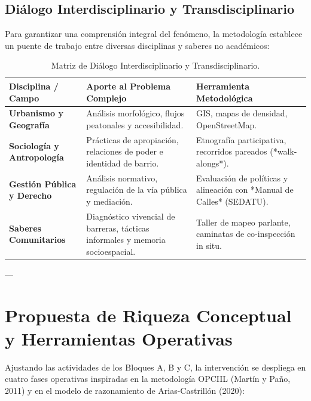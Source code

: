 \documentclass[12pt,a4paper]{article}
\begin{document}
\subsection{Diálogo Interdisciplinario y Transdisciplinario}
Para garantizar una comprensión integral del fenómeno, la metodología establece un puente de trabajo entre diversas disciplinas y saberes no académicos:

\begin{table}[htbp]
\centering
\small
\caption{Matriz de Diálogo Interdisciplinario y Transdisciplinario.}
\begin{tabular}{p{4.2cm} p{5.2cm} p{5.2cm}}
\toprule
\textbf{Disciplina / Campo} & \textbf{Aporte al Problema Complejo} & \textbf{Herramienta Metodológica} \\
\midrule
\textbf{Urbanismo y Geografía} & Análisis morfológico, flujos peatonales y accesibilidad. & GIS, mapas de densidad, OpenStreetMap. \\
\midrule
\textbf{Sociología y Antropología} & Prácticas de apropiación, relaciones de poder e identidad de barrio. & Etnografía participativa, recorridos pareados (*walk-alongs*). \\
\midrule
\textbf{Gestión Pública y Derecho} & Análisis normativo, regulación de la vía pública y mediación. & Evaluación de políticas y alineación con *Manual de Calles* (SEDATU). \\
\midrule
\textbf{Saberes Comunitarios} & Diagnóstico vivencial de barreras, tácticas informales y memoria socioespacial. & Taller de mapeo parlante, caminatas de co-inspección in situ. \\
\bottomrule
\end{tabular}
\end{table}

---

\section{Propuesta de Riqueza Conceptual y Herramientas Operativas}

Ajustando las actividades de los Bloques A, B y C, la intervención se despliega en cuatro fases operativas inspiradas en la metodología OPCIIL (Martín y Paño, 2011) y en el modelo de razonamiento de Arias-Castrillón (2020):
\end{document}
